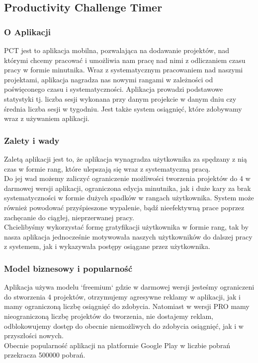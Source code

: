 \documentclass[a4paper,11pt]{report}
\begin{document}
\subsection{Productivity Challenge Timer}
\subsubsection{O Aplikacji}
PCT jest to aplikacja mobilna, pozwalająca na dodawanie projektów,
 nad którymi chcemy pracować i umożliwia nam pracę nad nimi z odliczaniem czasu pracy w formie minutnika.
 Wraz z systematycznym pracowaniem nad naszymi projektami,
 aplikacja nagradza nas nowymi rangami w zależności od poświęconego czasu i systematyczności.
 Aplikacja prowadzi podstawowe statystyki tj. liczba sesji wykonana przy danym projekcie w danym dniu
 czy średnia liczba sesji w tygodniu. Jest także system osiągnięć, które zdobywamy wraz z używaniem aplikacji.
\subsubsection{Zalety i wady}
Zaletą aplikacji jest to, że aplikacja wynagradza użytkownika za spędzany z nią czas w formie rang,
 które ulepszają się wraz z systematyczną pracą.
\vspace{0,5cm}
\\Do jej wad możemy zaliczyć ograniczenie możliwości tworzenia projektów do 4 w darmowej wersji aplikacji,
ograniczona edycja minutnika, jak i duże kary za brak systematyczności w formie dużych spadków w rangach użytkownika.
System może również powodować przyśpieszone wypalenie, bądź nieefektywną prace poprzez zachęcanie do ciągłej, nieprzerwanej pracy.
\vspace{0,5cm}
\\Chcielibyśmy wykorzystać formę gratyfikacji użytkownika w formie rang, tak by nasza aplikacja
 jednocześnie motywowała naszych użytkowników do dalszej pracy z systemem, jak i
 wykazywała postępy osiągane przez użytkownika.
\subsubsection{Model biznesowy i popularność}
Aplikacja używa modelu `freemium` gdzie w darmowej wersji jesteśmy ograniczeni do stworzenia 4 projektów,
 otrzymujemy agresywne reklamy w aplikacji, jak i mamy ograniczoną liczbę osiągnięć do zdobycia.
 Natomiast w wersji PRO mamy nieograniczoną liczbę projektów do tworzenia, nie dostajemy reklam,
 odblokowujemy dostęp do obecnie niemożliwych do zdobycia osiągnięć, jak i w przyszłości nowych.
\vspace{0,5cm}\\
Obecnie popularność aplikacji na platformie Google Play w liczbie pobrań przekracza 500000 pobrań.
\end{document}
